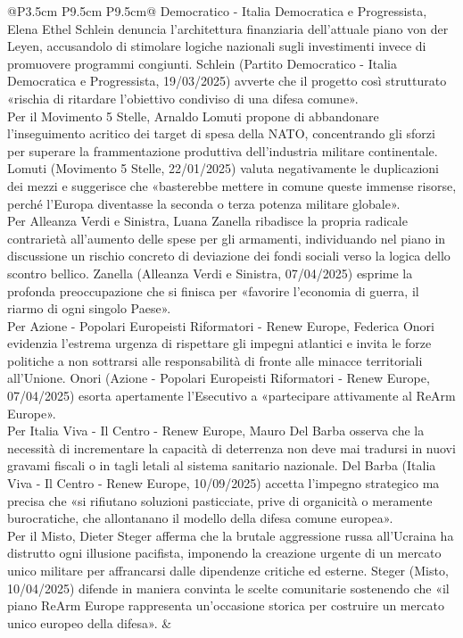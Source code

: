 \documentclass[a4paper,11pt]{article}
\begin{document}
\begin{landscape}
\begin{longtable}{@{}P{3.5cm} P{9.5cm} P{9.5cm}@{}}
Democratico - Italia Democratica e Progressista, Elena Ethel Schlein denuncia l'architettura finanziaria dell'attuale piano von der Leyen, accusandolo di stimolare logiche nazionali sugli investimenti invece di promuovere programmi congiunti. Schlein (Partito Democratico - Italia Democratica e Progressista, 19/03/2025) avverte che il progetto così strutturato «rischia di ritardare l'obiettivo condiviso di una difesa comune».\\[6pt] Per il Movimento 5 Stelle, Arnaldo Lomuti propone di abbandonare l'inseguimento acritico dei target di spesa della NATO, concentrando gli sforzi per superare la frammentazione produttiva dell'industria militare continentale. Lomuti (Movimento 5 Stelle, 22/01/2025) valuta negativamente le duplicazioni dei mezzi e suggerisce che «basterebbe mettere in comune queste immense risorse, perché l'Europa diventasse la seconda o terza potenza militare globale».\\[6pt] Per Alleanza Verdi e Sinistra, Luana Zanella ribadisce la propria radicale contrarietà all'aumento delle spese per gli armamenti, individuando nel piano in discussione un rischio concreto di deviazione dei fondi sociali verso la logica dello scontro bellico. Zanella (Alleanza Verdi e Sinistra, 07/04/2025) esprime la profonda preoccupazione che si finisca per «favorire l'economia di guerra, il riarmo di ogni singolo Paese».\\[6pt] Per Azione - Popolari Europeisti Riformatori - Renew Europe, Federica Onori evidenzia l'estrema urgenza di rispettare gli impegni atlantici e invita le forze politiche a non sottrarsi alle responsabilità di fronte alle minacce territoriali all'Unione. Onori (Azione - Popolari Europeisti Riformatori - Renew Europe, 07/04/2025) esorta apertamente l'Esecutivo a «partecipare attivamente al ReArm Europe».\\[6pt] Per Italia Viva - Il Centro - Renew Europe, Mauro Del Barba osserva che la necessità di incrementare la capacità di deterrenza non deve mai tradursi in nuovi gravami fiscali o in tagli letali al sistema sanitario nazionale. Del Barba (Italia Viva - Il Centro - Renew Europe, 10/09/2025) accetta l'impegno strategico ma precisa che «si rifiutano soluzioni pasticciate, prive di organicità o meramente burocratiche, che allontanano il modello della difesa comune europea».\\[6pt] Per il Misto, Dieter Steger afferma che la brutale aggressione russa all'Ucraina ha distrutto ogni illusione pacifista, imponendo la creazione urgente di un mercato unico militare per affrancarsi dalle dipendenze critiche ed esterne. Steger (Misto, 10/04/2025) difende in maniera convinta le scelte comunitarie sostenendo che «il piano ReArm Europe rappresenta un'occasione storica per costruire un mercato unico europeo della difesa». & \\

\end{longtable}
\end{landscape}
\end{document}
